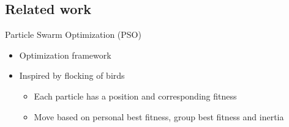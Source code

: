 \documentclass[11pt,t]{beamer}
\begin{document}
\subsection{Related work}
\begin{frame}{Particle Swarm Optimization (PSO)}
\begin{itemize}
	\item Optimization framework
	\item Inspired by flocking of birds
	\begin{itemize}
		\item Each particle has a position and corresponding fitness
		\item Move based on personal best fitness, group best fitness and inertia 
	\end{itemize}
\end{itemize}
	      
\begin{figure}
\centering
\scalebox{0.5}{%
\begin{tikzpicture}[x=0.75pt,y=0.75pt,yscale=-1,xscale=1]



\end{tikzpicture}}
\end{figure}
\end{frame}
\end{document}
